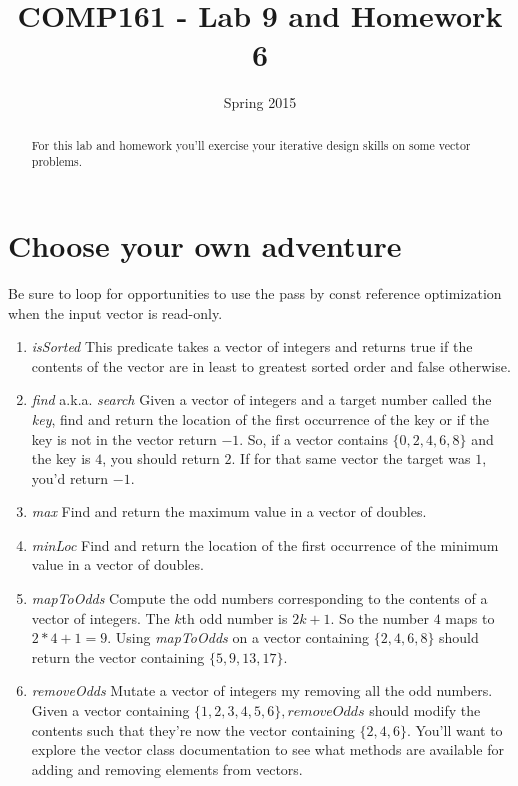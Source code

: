 \documentclass[]{tufte-handout}
\title{COMP161 - Lab 9 and Homework 6}
\author{}
\date{Spring 2015}
\begin{document}
\maketitle

\begin{abstract}
For this lab and homework you'll exercise your iterative design skills on some vector problems.
\end{abstract}

\section{Choose your own adventure}

Be sure to loop for opportunities to use the pass by const reference optimization when the input vector is read-only. 

\begin{enumerate}
\item \textit{isSorted} \newline
This predicate takes a vector of integers and returns true if the contents of the vector are in least to greatest sorted order and false otherwise. 

\item \textit{find} a.k.a. \textit{search} \newline
Given a vector of integers and a target number called the \textit{key}, find and return the location of the first occurrence of the key or if the key is not in the vector return $-1$. So, if a vector contains $\{0,2,4,6,8\}$ and the key is $4$, you should return $2$. If for that same vector the target was $1$, you'd return $-1$.  

\item \textit{max} \newline
Find and return the maximum value in a vector of doubles. 

\item \textit{minLoc} \newline
Find and return the location of the first occurrence of the minimum value in a vector of doubles. 

\item \textit{mapToOdds} \newline
Compute the odd numbers corresponding to the contents of a vector of integers. The $k$th odd number is $2k+1$. So the number $4$ maps to $2*4+1 = 9$.  Using \textit{mapToOdds} on a vector containing $\{2,4,6,8\}$ should return the vector containing $\{5,9,13,17\}$.  

\item \textit{removeOdds} \newline
Mutate a vector of integers my removing all the odd numbers. Given a vector containing $\{1,2,3,4,5,6\}, \textit{removeOdds}$ should modify the contents such that they're now the vector containing $\{2,4,6\}$. You'll want to explore the vector class documentation to see what methods are available for adding and removing elements from vectors.

\end{enumerate}  
\end{document}
